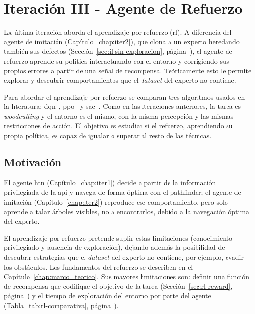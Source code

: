 \chapter{Iteración III - Agente de Refuerzo}
\label{chap:iter3}

\lettrine{L}{a} última iteración aborda el aprendizaje por refuerzo (\gls{rl}). A
diferencia del agente de imitación (Capítulo~\ref{chap:iter2}), que clona a un
experto heredando también sus defectos (Sección~\ref{sec:il-sin-exploracion}, página~\pageref{sec:il-sin-exploracion}),
el agente de refuerzo aprende su \gls{política}
interactuando con el entorno y corrigiendo sus propios errores a partir de una señal
de recompensa. Teóricamente esto le permite explorar y descubrir comportamientos
que el \textit{dataset} del experto no contiene.

Para abordar el aprendizaje por refuerzo se comparan tres algoritmos usados 
en la literatura: \gls{dqn}~\cite{DBLP:journals/nature/MnihKSRVBGRFOPB15},
\gls{ppo}~\cite{DBLP:journals/corr/SchulmanWDRK17} y \gls{sac}~\cite{DBLP:journals/corr/abs-1801-01290}.
Como en las iteraciones anteriores, la tarea es \textit{\gls{woodcutting}} y el entorno es el mismo, 
con la misma percepción y las mismas restricciones de acción. El objetivo es estudiar si el refuerzo,
aprendiendo su propia \gls{política}, es capaz de igualar o superar al resto de las técnicas.

\section{Motivación}
El agente \gls{htn} (Capítulo~\ref{chap:iter1}) decide a partir de la información
privilegiada de la \acrshort{api} y navega de forma óptima con el \gls{pathfinder}; el agente
de imitación (Capítulo~\ref{chap:iter2}) reproduce ese comportamiento, 
pero solo aprende a talar árboles visibles, no a encontrarlos,
debido a la navegación óptima del experto.

El aprendizaje por refuerzo pretende suplir estas limitaciones (conocimiento privilegiado
y ausencia de exploración), dejando además la posibilidad de descubrir estrategias que el \textit{dataset} del
experto no contiene, por ejemplo, evadir los obstáculos. 
Los fundamentos del refuerzo se describen en el Capítulo~\ref{chap:marco_teorico}. 
Sus mayores limitaciones son: definir una función de recompensa que codifique el 
objetivo de la tarea (Sección~\ref{sec:rl-reward}, página~\pageref{sec:rl-reward}) y el tiempo de 
exploración del entorno por parte del agente (Tabla~\ref{tab:rl-comparativa}, página~\pageref{tab:rl-comparativa}).

